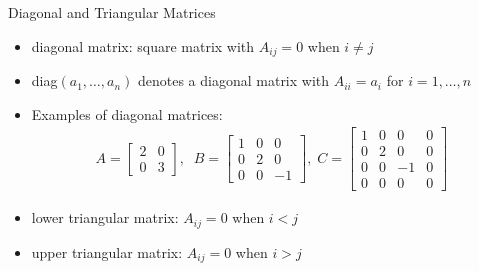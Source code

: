 \begin{frame}{Diagonal and Triangular Matrices}
\begin{itemize}
    \item diagonal matrix: square matrix with $A_{ij} = 0$ when $i\neq j$
    \item diag$(a_1, \ldots, a_n)$ denotes a diagonal matrix with $A_{ii}=a_i$ for $i=1, \ldots, n$
    \item Examples of diagonal matrices:
    \begin{align}
        A = \begin{bmatrix}
            2 & 0 \\ 0 & 3
        \end{bmatrix}, \;\; B = \begin{bmatrix}
            1 & 0 & 0 \\
            0 & 2 & 0 \\
            0 & 0 & -1
        \end{bmatrix}, \; C = \begin{bmatrix}
            1 & 0 & 0 & 0 \\
            0 & 2 & 0 & 0 \\
            0 & 0 & -1 & 0\\
            0 & 0 & 0 & 0
        \end{bmatrix}
    \end{align}
    \item lower triangular matrix: $A_{ij} = 0$ when $i<j$
    \item upper triangular matrix: $A_{ij} = 0$ when $i>j$
\end{itemize}
\end{frame}

